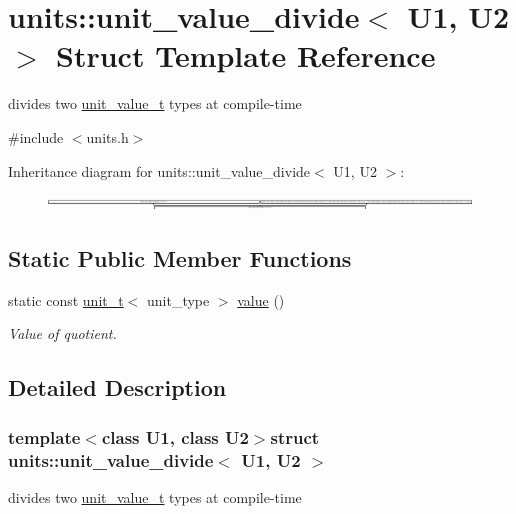 \hypertarget{structunits_1_1unit__value__divide}{}\section{units\+:\+:unit\+\_\+value\+\_\+divide$<$ U1, U2 $>$ Struct Template Reference}
\label{structunits_1_1unit__value__divide}


divides two \hyperlink{structunits_1_1unit__value__t}{unit\+\_\+value\+\_\+t} types at compile-\/time  




{\ttfamily \#include $<$units.\+h$>$}

Inheritance diagram for units\+:\+:unit\+\_\+value\+\_\+divide$<$ U1, U2 $>$\+:\begin{figure}[H]
\begin{center}
\leavevmode
\includegraphics[height=0.320733cm]{structunits_1_1unit__value__divide}
\end{center}
\end{figure}
\subsection*{Static Public Member Functions}
\begin{DoxyCompactItemize}
\item 
static const \hyperlink{classunits_1_1unit__t}{unit\+\_\+t}$<$ unit\+\_\+type $>$ \hyperlink{structunits_1_1unit__value__divide_a823b73d9ccf9df2b17fcfd96f6b1e661}{value} ()
\begin{DoxyCompactList}\small\item\em Value of quotient. \end{DoxyCompactList}\end{DoxyCompactItemize}


\subsection{Detailed Description}
\subsubsection*{template$<$class U1, class U2$>$struct units\+::unit\+\_\+value\+\_\+divide$<$ U1, U2 $>$}

divides two \hyperlink{structunits_1_1unit__value__t}{unit\+\_\+value\+\_\+t} types at compile-\/time 


